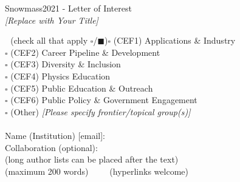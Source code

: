 \documentclass[11pt]{article}
\begin{document}
\begin{raggedright} 
\huge
Snowmass2021 - Letter of Interest \hfill \\[+1em]
\textit{[Replace with Your Title]} \hfill \\[+1em]
\end{raggedright}
​
\normalsize
​
  (check all that apply $\square$/$\blacksquare$)
​
\noindent $\square$ (CEF1) Applications \& Industry \\
\noindent $\square$ (CEF2) Career Pipeline \& Development \\ 
\noindent $\square$ (CEF3) Diversity \& Inclusion  \\
\noindent $\square$ (CEF4) Physics Education \\
\noindent $\square$ (CEF5) Public Education \& Outreach \\
\noindent $\square$ (CEF6) Public Policy \& Government Engagement \\
\noindent $\square$ (Other) {\it [Please specify frontier/topical group(s)]} \\
​
\\
Name (Institution) [email]: \\
Collaboration (optional): \\
​
 (long author lists can be placed after the text) \\[+1em]
​
 (maximum 200 words)
​
\clearpage
​
​
\clearpage
~
\clearpage
​
 (hyperlinks welcome) \\
​
\vspace{3.5in}
​
\\
​
​
\end{document}
